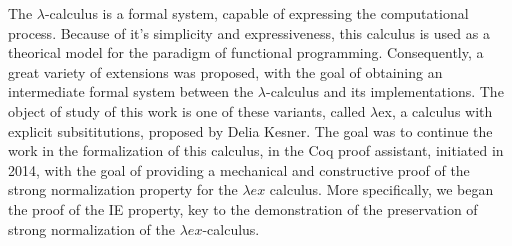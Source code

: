 The $\lambda$-calculus is a formal system, capable of expressing the
computational process.  Because of it's simplicity and expressiveness, this
calculus is used as a theorical model for the paradigm of functional
programming. Consequently, a great variety of extensions was proposed, with
the goal of obtaining an intermediate formal system between the
$\lambda$-calculus and its implementations.  The object of study of this
work is one of these variants, called $\lambda$ex, a calculus with explicit
subsititutions, proposed by Delia Kesner. The goal was to continue the work
in the formalization of this calculus, in the Coq proof assistant, initiated
in 2014, with the goal of providing a mechanical and constructive proof of
the strong normalization property for the $\lambda ex$ calculus. More
specifically, we began the proof of the IE property, key to the
demonstration of the preservation of strong normalization of the $\lambda
ex$-calculus.
